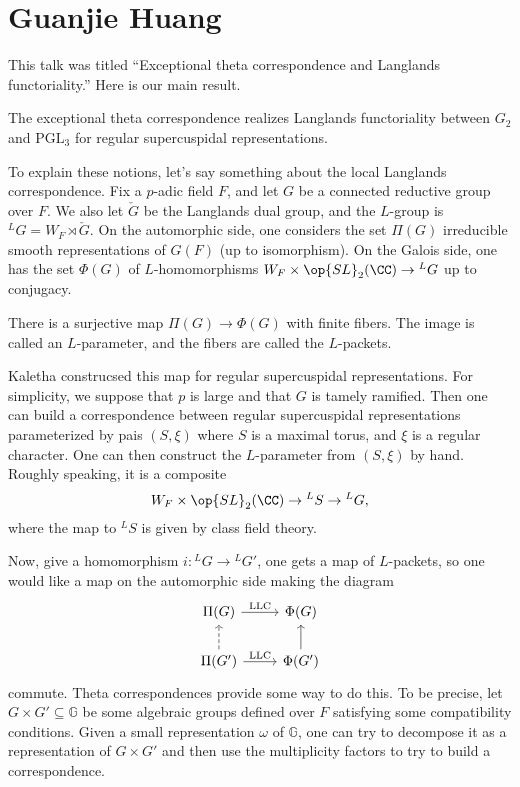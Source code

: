 \documentclass{article}
\begin{document}
\section{Guanjie Huang}
This talk was titled ``Exceptional theta correspondence and Langlands functoriality.'' Here is our main result.
\begin{theorem}
	The exceptional theta correspondence realizes Langlands functoriality between $G_2$ and $\mathrm{PGL}_3$ for regular supercuspidal representations.
\end{theorem}
To explain these notions, let's say something about the local Langlands correspondence. Fix a $p$-adic field $F$, and let $G$ be a connected reductive group over $F$. We also let $\check G$ be the Langlands dual group, and the $L$-group is ${}^LG=W_F\rtimes\check G$. On the automorphic side, one considers the set $\Pi(G)$ irreducible smooth representations of $G(F)$ (up to isomorphism). On the Galois side, one has the set $\Phi(G)$ of $L$-homomorphisms $W_F\times\op{SL}_2(\CC)\to{{}^LG}$ up to conjugacy.
\begin{conj}
	There is a surjective map $\Pi(G)\to\Phi(G)$ with finite fibers. The image is called an $L$-parameter, and the fibers are called the $L$-packets.
\end{conj}
Kaletha construcsed this map for regular supercuspidal representations. For simplicity, we suppose that $p$ is large and that $G$ is tamely ramified. Then one can build a correspondence between regular supercuspidal representations parameterized by pais $(S,\xi)$ where $S$ is a maximal torus, and $\xi$ is a regular character. One can then construct the $L$-parameter from $(S,\xi)$ by hand. Roughly speaking, it is a composite
\[W_F\times\op{SL}_2(\CC)\to{^LS}\to{^LG},\]
where the map to $^LS$ is given by class field theory.

Now, give a homomorphism $i\colon{^LG}\to{^LG'}$, one gets a map of $L$-packets, so one would like a map on the automorphic side making the diagram
\[\begin{tikzcd}
	{\Pi(G)} & {\Phi(G)} \\
	{\Pi(G')} & {\Phi(G')}
	\arrow["{\mathrm{LLC}}", from=1-1, to=1-2]
	\arrow[dashed, from=2-1, to=1-1]
	\arrow["{\mathrm{LLC}}", from=2-1, to=2-2]
	\arrow[from=2-2, to=1-2]
\end{tikzcd}\]
commute. Theta correspondences provide some way to do this. To be precise, let $G\times G'\subseteq\mathbb G$ be some algebraic groups defined over $F$ satisfying some compatibility conditions. Given a small representation $\omega$ of $\mathbb G$, one can try to decompose it as a representation of $G\times G'$ and then use the multiplicity factors to try to build a correspondence.
\end{document}
